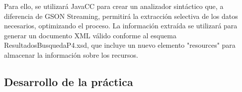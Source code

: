 


Para ello, se utilizará JavaCC para crear un analizador sintáctico que, a diferencia de GSON Streaming, permitirá la extracción selectiva de los datos necesarios, optimizando el proceso. La información extraída se utilizará para generar un documento XML válido conforme al esquema ResultadosBusquedaP4.xsd, que incluye un nuevo elemento "resources" para almacenar la información sobre los recursos.






\subsection{Desarrollo de la práctica}


